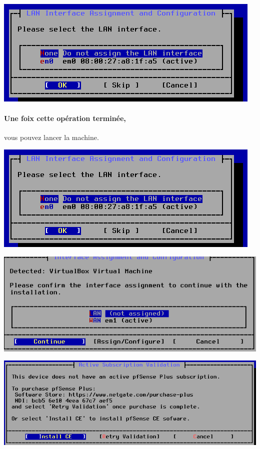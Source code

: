 \documentclass[french, 12pt]{article}%
\begin{document}
\begin{center}
\includegraphics[scale=0.5]{./ressource/VM_network3.png}
\end{center}

\paragraph{Une foix cette opération terminée,} vous pouvez lancer la machine.

\begin{center}
\includegraphics[scale=0.5]{./ressource/VM_network4.png}
\end{center}

\begin{center}
\includegraphics[scale=0.5]{./ressource/VM_network5.png}
\end{center}

\begin{center}
\includegraphics[scale=0.5]{./ressource/VM_network6.png}
\end{center}
\end{document}
